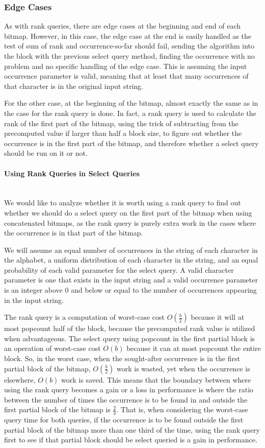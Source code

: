 \subsubsection{Edge Cases}
As with rank queries, there are edge cases at the beginning and end of each bitmap.
However, in this case, the edge case at the end is easily handled as the test of sum of rank and occurrence-so-far should fail, sending the algorithm into the block with the previous select query method, finding the occurrence with no problem and no specific handling of the edge case.
This is assuming the input occurrence parameter is valid, meaning that at least that many occurrences of that character is in the original input string.

For the other case, at the beginning of the bitmap, almost exactly the same as in the case for the rank query is done.
In fact, a rank query is used to calculate the rank of the first part of the bitmap, using the trick of subtracting from the precomputed value if larger than half a block size, to figure out whether the occurrence is in the first part of the bitmap, and therefore whether a select query should be run on it or not.

\paragraph{Using Rank Queries in Select Queries}~\\
We would like to analyze whether it is worth using a rank query to find out whether we should do a select query on the first part of the bitmap when using concatenated bitmaps, as the rank query is purely extra work in the cases where the occurrence is in that part of the bitmap.

We will assume an equal number of occurrences in the string of each character in the alphabet, a uniform distribution of each character in the string, and an equal probability of each valid parameter for the select query.
A valid character parameter is one that exists in the input string and a valid occurrence parameter is an integer above 0 and below or equal to the number of occurrences appearing in the input string.

The rank query is a computation of worst-case cost $O(\frac{b}{2})$ because it will at most popcount half of the block, because the precomputed rank value is utilized when advantageous.
The select query using popcount in the first partial block is an operation of worst-case cost $O(b)$ because it can at most popcount the entire block.
So, in the worst case, when the sought-after occurrence is in the first partial block of the bitmap, $O(\frac{b}{2})$ work is wasted, yet when the occurrence is elsewhere, $O(b)$ work is saved.
This means that the boundary between where using the rank query becomes a gain or a loss in performance is where the ratio between the number of times the occurrence is to be found in and outside the first partial block of the bitmap is $\frac{2}{3}$.
That is, when considering the worst-case query time for both queries, if the occurrence is to be found outside the first partial block of the bitmap more than one third of the time, using the rank query first to see if that partial block should be select queried is a gain in performance.

